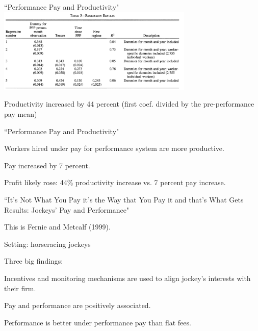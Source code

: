 \documentclass[aspectratio=169,usenames,dvipsnames]{beamer}
\newenvironment{wideitemize}{\itemize\addtolength{\itemsep}{10pt}}{\enditemize}
\begin{document}
\begin{frame}{``Performance Pay and Productivity"}
\centering
    \includegraphics[width=0.7\textwidth]{pictures/safelite_table.png}
    
    Productivity increased by 44 percent (first coef. divided by the pre-performance pay mean)
\end{frame}


\begin{frame}{``Performance Pay and Productivity"}
    \begin{wideitemize}
        \item Workers hired under pay for performance system are more productive.
        \item Pay increased by 7 percent.
        \item Profit likely rose: 44\% productivity increase vs. 7 percent pay increase.
    \end{wideitemize}
\end{frame}




\begin{frame}{``It’s Not What You Pay it’s the Way that You Pay it and that’s What Gets Results: Jockeys’ Pay and Performance" }
    \begin{wideitemize}
        \item This is Fernie and Metcalf (1999).
        \item Setting: horseracing jockeys
        \item Three big findings:

        \begin{wideitemize}
            \item Incentives and monitoring mechanisms are used to align jockey's interests with their firm.
            \item Pay and performance are positively associated.
            \item Performance is better under performance pay than flat fees.
        \end{wideitemize}
    \end{wideitemize}
\end{frame}
\end{document}
